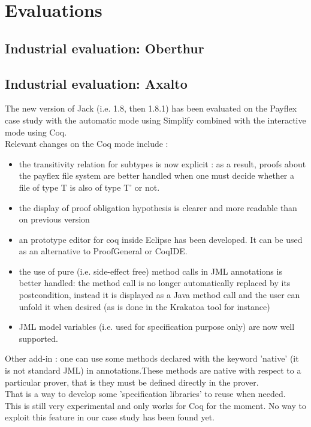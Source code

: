 \chapter{Evaluations}
\section{Industrial evaluation: Oberthur}
\section{Industrial evaluation: Axalto}
The new version of Jack (i.e. 1.8, then 1.8.1) has been evaluated on the 
Payflex case study with the automatic mode using Simplify combined with 
the interactive mode using Coq.\\

Relevant changes on the Coq mode include :
\begin{itemize}
\item the transitivity relation for subtypes is now explicit :
      as a result, proofs about the payflex file system are better handled
      when one must decide whether a file of type T is also of type T' 
or not.
  \item  the display of proof obligation hypothesis is clearer and more 
readable than on previous version
  \item an prototype editor for coq inside Eclipse has been developed. It 
can be used as an   
      alternative to ProofGeneral or CoqIDE.
  \item the use of pure (i.e. side-effect free) method calls in JML 
annotations  is better handled:
      the method call is no longer automatically replaced by its 
postcondition, instead it is    
      displayed as a Java method call and the user can unfold it when 
desired (as is done in the
      Krakatoa tool for instance)
  \item JML model variables (i.e. used for specification purpose only) are 
now well supported.
\end{itemize}

\noindent Other add-in :
one can use some methods declared with the keyword 'native' (it is 
not standard JML) in annotations.These methods are native with respect to a particular prover, that is they must be defined directly in the prover.\\
      That is a way to develop some 'specification libraries' to reuse 
when needed.\\ 
      This is still very experimental and only works for Coq for the 
moment. No way to exploit this feature in our case
     study has been found yet.\\

